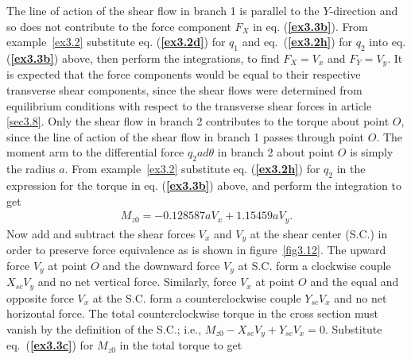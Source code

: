 \documentclass{AeroStructure-ERJohnson}
\begin{document}
\begin{example}
The line of action of the shear flow in branch 1 is parallel to the $Y$-direction and so does not contribute to the force component $F_{X}$ in eq. (\textbf{\ref{ex3.3b}}). From example~\ref{ex3.2} substitute eq. (\textbf{\ref{ex3.2d}}) for $q_{1}$ and eq.~(\textbf{\ref{ex3.2h}}) for $q_{2}$ into eq. (\textbf{\ref{ex3.3b}}) above, then perform the integrations, to find $F_{X}=V_{x}$ and $F_{Y}=V_{y}$. It is expected that the force components would be equal to their respective transverse shear components, since the shear flows were determined from equilibrium conditions with respect to the transverse shear forces in article \ref{sec3.8}. Only the shear flow in branch 2 contributes to the torque about point $O$, since the line of action of the shear flow in branch 1 passes through point $O$. The moment arm to the differential force $q_{2} a d \theta$ in branch 2 about point $O$ is simply the radius $a$. From example~\ref{ex3.2} substitute eq. (\textbf{\ref{ex3.2h}}) for $q_{2}$ in the expression for the torque in eq. (\textbf{\ref{ex3.3b}}) above, and perform the integration to get
\begin{align}\label{ex3.3c}
M_{z 0}=-0.128587 a V_{x}+1.15459 a V_{y}. \tag{c}
\end{align}
{\def\thefigure{3.12}
\def\floataboveskip{-15pt}
}
Now add and subtract the shear forces $V_x$ and $V_y$ at the shear center (S.C.) in order to preserve force equivalence as is shown in figure~\ref{fig3.12}. The upward force $V_y$ at point $O$ and the downward force $V_y$ at S.C. form a clockwise couple $X_{s c} V_{y}$ and no net vertical force. Similarly, force $V_x$ at point $O$ and the equal and opposite force $V_x$ at the S.C. form a counterclockwise couple $Y_{s c} V_{x}$ and no net horizontal force. The total counterclockwise torque in the cross section must vanish by the definition of the S.C.; i.e., $M_{z 0}-X_{s c} V_{y}+Y_{s c} V_{x}=0$. Substitute eq.~(\textbf{\ref{ex3.3c}}) for $M_{z 0}$ in the total torque to get

\end{example}
\end{document}
